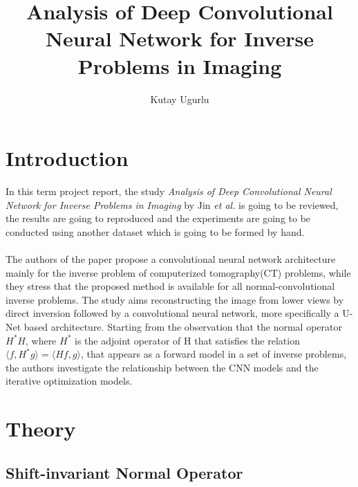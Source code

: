 \documentclass[journal, onecolumn, 11pt]{IEEEtran}
\author{Kutay Ugurlu}
\title{Analysis of Deep Convolutional Neural Network for Inverse Problems in Imaging
}
\begin{document}
\maketitle
\tableofcontents
\listoffigures
\listoftables
\clearpage

\section{Introduction}
In this term project report, the study \textit{Analysis of Deep Convolutional Neural Network for Inverse Problems in Imaging} by Jin \textit{et al.} \cite{FBPConvNet} is going to be reviewed, the results are going to reproduced and the experiments are going to be conducted using another dataset which is going to be formed by hand. 
\\
\\
The authors of the paper propose a convolutional neural network architecture mainly for the inverse problem of computerized tomography(CT) problems, while they stress that the proposed method is available for all normal-convolutional inverse problems. The study aims reconstructing the image from lower views by direct inversion followed by a convolutional neural network, more specifically a U-Net \cite{ronneberger2015u} based architecture. Starting from the observation that the normal operator $H^\ast H$, where $H^\ast$ is the adjoint operator of H that satisfies the relation $\langle f,H^\ast g \rangle = \langle Hf,g \rangle$, that appears as a forward model in a set of inverse problems, the authors investigate the relationship between the CNN models and the iterative optimization models.  

\section{Theory}

\subsection{Shift-invariant Normal Operator}
\end{document}
